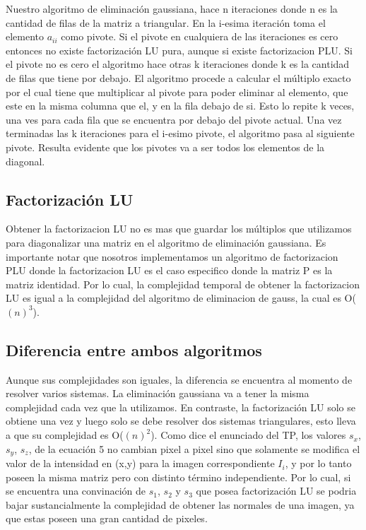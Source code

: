 \indent Nuestro algoritmo de eliminación gaussiana, hace n iteraciones donde n es la cantidad de filas de la matriz a triangular. En la i-esima iteración toma el elemento $a_{ii}$ como pivote. Si el pivote en cualquiera de las iteraciones es cero entonces no existe factorización LU pura, aunque si existe factorizacion PLU. Si el pivote no es cero el algoritmo hace otras k iteraciones donde k es la cantidad de filas que tiene por debajo. El algoritmo procede a calcular el múltiplo exacto por el cual tiene que multiplicar al pivote para poder eliminar al elemento, que este en la misma columna que el, y en la fila debajo de si. Esto lo repite k veces, una ves para cada fila que se encuentra por debajo del pivote actual. Una vez terminadas las k iteraciones para el i-esimo pivote, el algoritmo pasa al siguiente pivote. Resulta evidente que los pivotes va a ser todos los elementos de la diagonal. \par

\subsection{Factorización LU}

\indent Obtener la factorizacion LU no es mas que guardar los múltiplos que utilizamos para diagonalizar una matriz en el algoritmo de eliminación gaussiana. Es importante notar que nosotros implementamos un algoritmo de factorizacion PLU donde la factorizacion LU es el caso especifico donde la matriz P es la matriz identidad. Por lo cual, la complejidad temporal de obtener la factorizacion LU  es igual a la complejidad del algoritmo de eliminacion de gauss, la cual es O($(n)^{3}$).\par

\subsection{Diferencia entre ambos algoritmos}

\indent Aunque sus complejidades son iguales, la diferencia se encuentra al momento de resolver varios sistemas. La eliminación gaussiana va a tener la misma complejidad cada vez que la utilizamos. En contraste, la factorización LU solo se obtiene una vez y luego solo se debe resolver dos sistemas triangulares, esto lleva a que su complejidad es O($(n)^{2}$). Como dice el enunciado del TP, los valores $s_{x}$, $s_{y}$, $s_{z}$, de la ecuación 5 no cambian pixel a pixel sino que solamente se modifica el valor de la intensidad en (x,y) para la imagen correspondiente $I_{i}$, y por lo tanto poseen la misma matriz pero con distinto término independiente. Por lo cual, si se encuentra una convinación de $s_{1}$, $s_{2}$ y $s_{3}$ que posea factorización LU se podria bajar sustancialmente la complejidad de obtener las normales de una imagen, ya que estas poseen una gran cantidad de pixeles.\par


